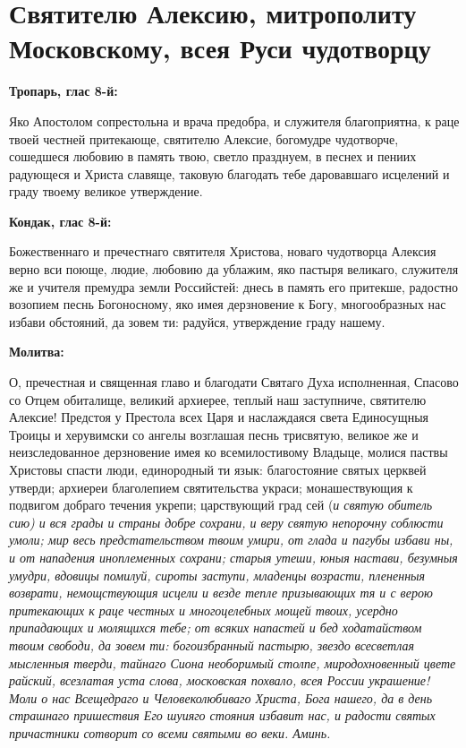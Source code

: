 \section{Святителю Алексию, митрополиту Московскому, всея Руси чудотворцу}
 


\bfseries Тропарь, глас 8-й:\normalfont{}\nopagebreak


Яко Апостолом сопрестольна и врача предобра, и служителя благоприятна, к раце твоей честней притекающе, святителю Алексие, богомудре чудотворче, сошедшеся любовию в память твою, светло празднуем, в песнех и пениих радующеся и Христа славяще, таковую благодать тебе даровавшаго исцелений и граду твоему великое утверждение.


\medskip


\bfseries Кондак, глас 8-й:\normalfont{}\nopagebreak


Божественнаго и пречестнаго святителя Христова, новаго чудотворца Алексия верно вси поюще, людие, любовию да ублажим, яко пастыря великаго, служителя же и учителя премудра земли Российстей: днесь в память его притекше, радостно возопием песнь Богоносному, яко имея дерзновение к Богу, многообразных нас избави обстояний, да зовем ти: радуйся, утверждение граду нашему.


\medskip


\bfseries Молитва:\normalfont{}\nopagebreak


О, пречестная и священная главо и благодати Святаго Духа исполненная, Спасово со Отцем обиталище, великий архиерее, теплый наш заступниче, святителю Алексие! Предстоя у Престола всех Царя и наслаждаяся света Единосущныя Троицы и херувимски со ангелы возглашая песнь трисвятую, великое же и неизследованное дерзновение имея ко всемилостивому Владыце, молися паствы Христовы спасти люди, единородный ти язык: благостояние святых церквей утверди; архиереи благолепием святительства украси; монашествующия к подвигом добраго течения укрепи; царствующий град сей (\itshape и святую обитель сию\normalfont{}) и вся грады и страны добре сохрани, и веру святую непорочну соблюсти умоли; мир весь предстательством твоим умири, от глада и пагубы избави ны, и от нападения иноплеменных сохрани; старыя утеши, юныя настави, безумныя умудри, вдовицы помилуй, сироты заступи, младенцы возрасти, плененныя возврати, немощствующия исцели и везде тепле призывающих тя и с верою притекающих к раце честных и многоцелебных мощей твоих, усердно припадающих и молящихся тебе; от всяких напастей и бед ходатайством твоим свободи, да зовем ти: богоизбранный пастырю, звездо всесветлая мысленныя тверди, тайнаго Сиона необоримый столпе, миродохновенный цвете райский, всезлатая уста слова, московская похвало, всея России украшение! Моли о нас Всещедраго и Человеколюбиваго Христа, Бога нашего, да в день страшнаго пришествия Его шуияго стояния избавит нас, и радости святых причастники сотворит со всеми святыми во веки. Аминь.


